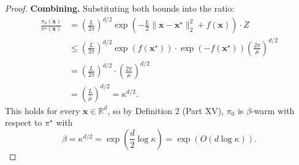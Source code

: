 \begin{proof}
\textbf{Combining.} Substituting both bounds into the ratio:
\begin{align*}
\frac{\pi_0(\mathbf{x})}{\pi^\star(\mathbf{x})}
&= \left(\frac{L}{2\pi}\right)^{d/2} \exp\!\left(-\frac{L}{2}\|\mathbf{x} - \mathbf{x}^\star\|_2^2 + f(\mathbf{x})\right) \cdot Z \\
&\leq \left(\frac{L}{2\pi}\right)^{d/2} \exp(f(\mathbf{x}^\star)) \cdot \exp(-f(\mathbf{x}^\star))\left(\frac{2\pi}{\mu}\right)^{d/2} \\
&= \left(\frac{L}{2\pi}\right)^{d/2} \cdot \left(\frac{2\pi}{\mu}\right)^{d/2} \\
&= \left(\frac{L}{\mu}\right)^{d/2} = \kappa^{d/2}.
\end{align*}
This holds for every $\mathbf{x} \in \mathbb{R}^d$, so by Definition 2 (Part XV), $\pi_0$ is $\beta$-warm with respect to $\pi^\star$ with
\[
\beta = \kappa^{d/2} = \exp\!\left(\frac{d}{2}\log\kappa\right) = \exp(O(d\log\kappa)).
\]
\end{proof}

